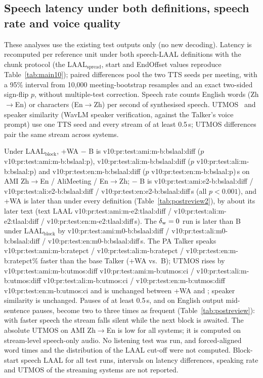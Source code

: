 \subsection{Speech latency under both definitions, speech rate and voice quality}
\label{app:postreview}

\ifPostReview
These analyses use the existing test outputs only (no new decoding). Latency is recomputed per reference unit under
both speech-LAAL definitions with the chunk protocol (the LAAL$_\text{spread}$, start and EndOffset values reproduce
Table~\ref{tab:main10}); paired differences pool the two TTS seeds per meeting, with a 95\% interval from 10{,}000
meeting-bootstrap resamples and an exact two-sided sign-flip $p$, without multiple-test correction. Speech rate counts
English words (Zh$\rightarrow$En) or characters (En$\rightarrow$Zh) per second of synthesised speech. UTMOS~\citep{saeki2022utmos}
and speaker similarity (WavLM speaker verification, against the Talker's voice prompt) use one TTS seed and every stream
of at least 0.5\,s; UTMOS differences pair the same stream across systems.

Under LAAL$_\text{block}$, \sys{}+WA $-$ B is \num{v10:pr:test:ami:m-b:bslaal:diff} ($p$ \num{v10:pr:test:ami:m-b:bslaal:p}),
\num{v10:pr:test:ali:m-b:bslaal:diff} ($p$ \num{v10:pr:test:ali:m-b:bslaal:p}) and \num{v10:pr:test:en:m-b:bslaal:diff}
($p$ \num{v10:pr:test:en:m-b:bslaal:p})\,s on AMI Zh$\rightarrow$En / AliMeeting / En$\rightarrow$Zh; \sys{} $-$ B is
\num{v10:pr:test:ami:e2-b:bslaal:diff} / \num{v10:pr:test:ali:e2-b:bslaal:diff} / \num{v10:pr:test:en:e2-b:bslaal:diff}\,s
(all $p<0.001$), and \sys{}+WA is later than \sys{} under every definition (Table~\ref{tab:postreview2}), by about its later
text (text LAAL \num{v10:pr:test:ami:m-e2:tlaal:diff} / \num{v10:pr:test:ali:m-e2:tlaal:diff} /
\num{v10:pr:test:en:m-e2:tlaal:diff}\,s). The $\delta_{\mathrm{w}}=0$ run is later than B under LAAL$_\text{block}$ by
\num{v10:pr:test:ami:m0-b:bslaal:diff} / \num{v10:pr:test:ali:m0-b:bslaal:diff} / \num{v10:pr:test:en:m0-b:bslaal:diff}\,s.
The PA Talker speaks \num{v10:pr:test:ami:m-b:ratepct} / \num{v10:pr:test:ali:m-b:ratepct} /
\num{v10:pr:test:en:m-b:ratepct}\% faster than the base Talker (\sys{}+WA vs.\ B); UTMOS rises by
\num{v10:pr:test:ami:m-b:utmos:diff} \num{v10:pr:test:ami:m-b:utmos:ci} / \num{v10:pr:test:ali:m-b:utmos:diff}
\num{v10:pr:test:ali:m-b:utmos:ci} / \num{v10:pr:test:en:m-b:utmos:diff} \num{v10:pr:test:en:m-b:utmos:ci} and is
unchanged between \sys{}+WA and \sys{}; speaker similarity is unchanged. Pauses of at least 0.5\,s, and on English output
mid-sentence pauses, become two to three times as frequent (Table~\ref{tab:postreview}): with faster speech the stream
falls silent while the next block is awaited. The absolute UTMOS on AMI Zh$\rightarrow$En is low for all systems; it is
computed on stream-level speech-only audio. No listening test was run, and forced-aligned word times and the
distribution of the LAAL cut-off were not computed.
\else
Block-start speech LAAL for all test runs, intervals on latency differences, speaking rate and UTMOS of the streaming
systems are not reported.
\fi

